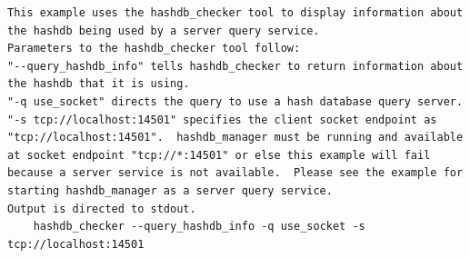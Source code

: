 \documentclass[11pt,twoside]{article}
\begin{document}
\begin{small}
\begin{verbatim}
This example uses the hashdb_checker tool to display information about
the hashdb being used by a server query service.
Parameters to the hashdb_checker tool follow:
"--query_hashdb_info" tells hashdb_checker to return information about
the hashdb that it is using.
"-q use_socket" directs the query to use a hash database query server.
"-s tcp://localhost:14501" specifies the client socket endpoint as
"tcp://localhost:14501".  hashdb_manager must be running and available
at socket endpoint "tcp://*:14501" or else this example will fail
because a server service is not available.  Please see the example for
starting hashdb_manager as a server query service.
Output is directed to stdout.
    hashdb_checker --query_hashdb_info -q use_socket -s tcp://localhost:14501
\end{verbatim}
\end{small}
\end{document}
